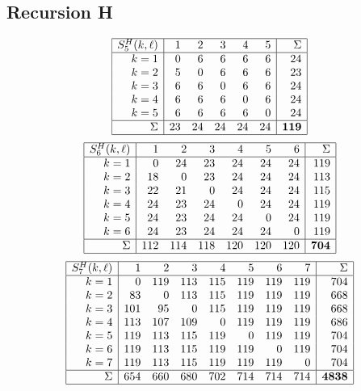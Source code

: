\documentclass[11pt]{amsart}
\theoremstyle{definition}
\begin{document}
\subsection{Recursion H}
\[ \begin{array}{|r|rrrrr|r|}
\hline
S^H_{5}(k, \ell)
& 1 & 2 & 3 & 4 & 5 & \Sigma \\ \hline
k= 1 & 0 & 6 & 6 & 6 & 6 & 24 \\
k= 2 & 5 & 0 & 6 & 6 & 6 & 23 \\
k= 3 & 6 & 6 & 0 & 6 & 6 & 24 \\
k= 4 & 6 & 6 & 6 & 0 & 6 & 24 \\
k= 5 & 6 & 6 & 6 & 6 & 0 & 24 \\
\hline
\Sigma & 23 & 24 & 24 & 24 & 24 & \mathbf{119}
\\ \hline
\end{array}
\]
\[ \begin{array}{|r|rrrrrr|r|}
\hline
S^H_{6}(k, \ell)
& 1 & 2 & 3 & 4 & 5 & 6 & \Sigma \\ \hline
k= 1 & 0 & 24 & 23 & 24 & 24 & 24 & 119 \\
k= 2 & 18 & 0 & 23 & 24 & 24 & 24 & 113 \\
k= 3 & 22 & 21 & 0 & 24 & 24 & 24 & 115 \\
k= 4 & 24 & 23 & 24 & 0 & 24 & 24 & 119 \\
k= 5 & 24 & 23 & 24 & 24 & 0 & 24 & 119 \\
k= 6 & 24 & 23 & 24 & 24 & 24 & 0 & 119 \\
\hline
\Sigma & 112 & 114 & 118 & 120 & 120 & 120 & \mathbf{704}
\\ \hline
\end{array}
\]
\[ \begin{array}{|r|rrrrrrr|r|}
\hline
S^H_{7}(k, \ell)
& 1 & 2 & 3 & 4 & 5 & 6 & 7 & \Sigma \\ \hline
k= 1 & 0 & 119 & 113 & 115 & 119 & 119 & 119 & 704 \\
k= 2 & 83 & 0 & 113 & 115 & 119 & 119 & 119 & 668 \\
k= 3 & 101 & 95 & 0 & 115 & 119 & 119 & 119 & 668 \\
k= 4 & 113 & 107 & 109 & 0 & 119 & 119 & 119 & 686 \\
k= 5 & 119 & 113 & 115 & 119 & 0 & 119 & 119 & 704 \\
k= 6 & 119 & 113 & 115 & 119 & 119 & 0 & 119 & 704 \\
k= 7 & 119 & 113 & 115 & 119 & 119 & 119 & 0 & 704 \\
\hline
\Sigma & 654 & 660 & 680 & 702 & 714 & 714 & 714 & \mathbf{4838}
\\ \hline
\end{array}
\]
\end{document}
